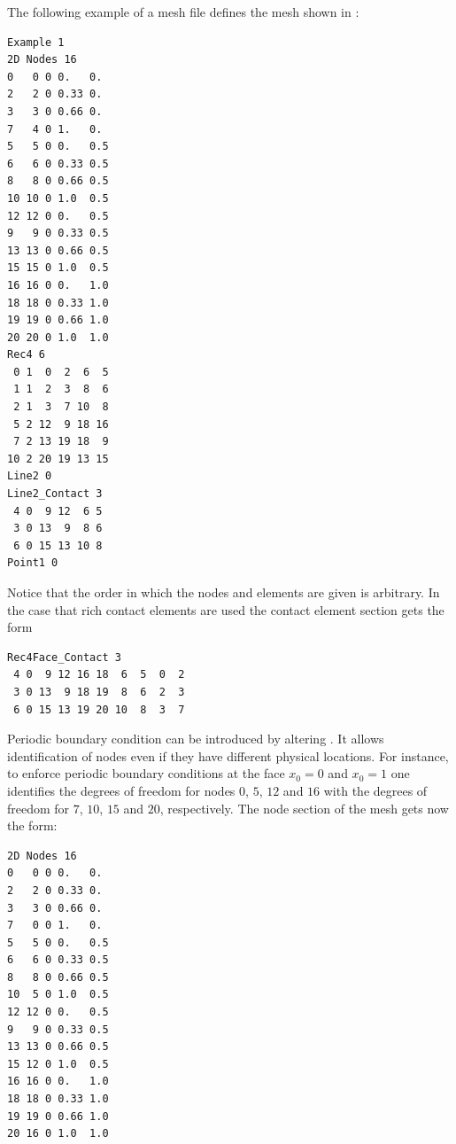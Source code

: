 The following example of a mesh file defines the mesh shown in :
\begin{verbatim}
Example 1
2D Nodes 16
0   0 0 0.   0.
2   2 0 0.33 0.
3   3 0 0.66 0.
7   4 0 1.   0.
5   5 0 0.   0.5
6   6 0 0.33 0.5
8   8 0 0.66 0.5
10 10 0 1.0  0.5
12 12 0 0.   0.5
9   9 0 0.33 0.5
13 13 0 0.66 0.5
15 15 0 1.0  0.5
16 16 0 0.   1.0
18 18 0 0.33 1.0
19 19 0 0.66 1.0
20 20 0 1.0  1.0
Rec4 6
 0 1  0  2  6  5
 1 1  2  3  8  6
 2 1  3  7 10  8
 5 2 12  9 18 16
 7 2 13 19 18  9
10 2 20 19 13 15
Line2 0
Line2_Contact 3
 4 0  9 12  6 5
 3 0 13  9  8 6
 6 0 15 13 10 8
Point1 0
\end{verbatim}
Notice that the order in which the nodes and elements are given is arbitrary.
In the case that rich contact elements are used the contact element section gets
 the form
\begin{verbatim}
Rec4Face_Contact 3
 4 0  9 12 16 18  6  5  0  2
 3 0 13  9 18 19  8  6  2  3
 6 0 15 13 19 20 10  8  3  7
\end{verbatim}
Periodic boundary condition  can be introduced by altering .
It allows identification of nodes even if they have different physical locations. For instance, to
enforce periodic boundary conditions at the face $x_0=0$ and $x_0=1$ one identifies
the degrees of freedom for nodes $0$, $5$, $12$ and $16$ with the degrees of freedom for
$7$, $10$, $15$ and $20$, respectively. The node section of the \finley mesh gets now the form:  
\begin{verbatim}
2D Nodes 16
0   0 0 0.   0.
2   2 0 0.33 0.
3   3 0 0.66 0.
7   0 0 1.   0.
5   5 0 0.   0.5
6   6 0 0.33 0.5
8   8 0 0.66 0.5
10  5 0 1.0  0.5
12 12 0 0.   0.5
9   9 0 0.33 0.5
13 13 0 0.66 0.5
15 12 0 1.0  0.5
16 16 0 0.   1.0
18 18 0 0.33 1.0
19 19 0 0.66 1.0
20 16 0 1.0  1.0
\end{verbatim}

\clearpage

\clearpage


